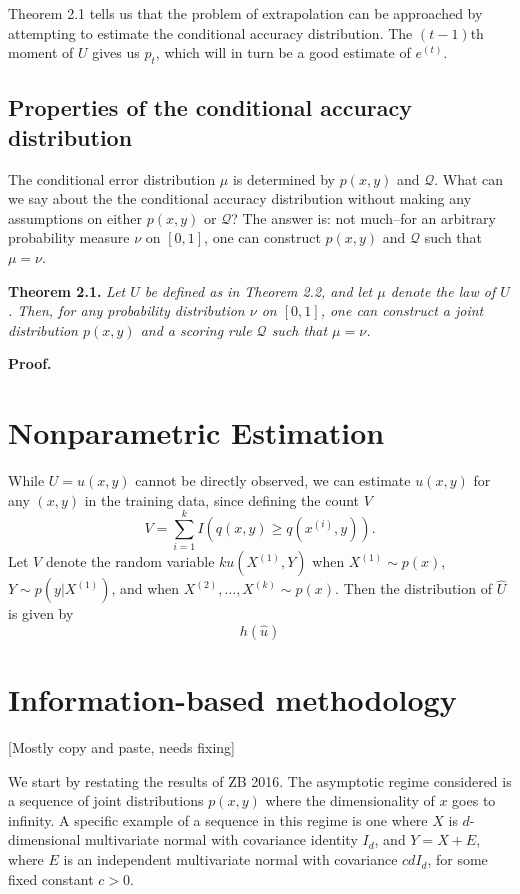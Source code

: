 \documentclass{article}
\begin{document}
Theorem 2.1 tells us that the problem of extrapolation can be
approached by attempting to estimate the conditional accuracy
distribution.  The $(t-1)$th moment of $U$ gives us $p_t$, which will
in turn be a good estimate of $e^{(t)}$.

\subsection{Properties of the conditional accuracy distribution}

The conditional error distribution $\mu$ is determined by $p(x, y)$
and $\mathcal{Q}$.  What can we say about the the conditional accuracy
distribution without making any assumptions on either $p(x, y)$ or
$\mathcal{Q}$?  The answer is: not much--for an arbitrary probability
measure $\nu$ on $[0,1]$, one can construct $p(x, y)$ and
$\mathcal{Q}$ such that $\mu = \nu$.

\noindent\textbf{Theorem 2.1.} \emph{ Let $U$ be defined as in Theorem
  2.2, and let $\mu$ denote the law of $U$.  Then, for any probability
  distribution $\nu$ on $[0,1]$, one can construct a joint
  distribution $p(x, y)$ and a scoring rule $\mathcal{Q}$ such that 
  $\mu = \nu$.
}

\noindent\textbf{Proof.}  


\section{Nonparametric Estimation}

While $U = u(x, y)$ cannot be directly observed, we can estimate $u(x, y)$ for any $(x, y)$ in the training data,
since defining the count $V$
\[
V = \sum_{i=1}^k I(q(x, y) \geq q(x^{(i)}, y)).
\]
Let $V$ denote the random variable $k u(X^{(1)}, Y)$ when $X^{(1)} \sim p(x)$,
$Y \sim p(y|X^{(1)})$, and when $X^{(2)},\hdots, X^{(k)} \sim p(x)$.
Then the distribution of $\hat{U}$ is given by
\[
h(\hat{u})
\]


\section{Information-based methodology}

[Mostly copy and paste, needs fixing]

We start by restating the results of ZB 2016.  The asymptotic regime
considered is a sequence of joint distributions $p(x,y)$ where the
dimensionality of $x$ goes to infinity.  A specific example of a
sequence in this regime is one where $X$ is $d$-dimensional
multivariate normal with covariance identity $I_d$, and $Y = X + E$,
where $E$ is an independent multivariate normal with covariance $cd
I_d$, for some fixed constant $c > 0$.
\end{document}
